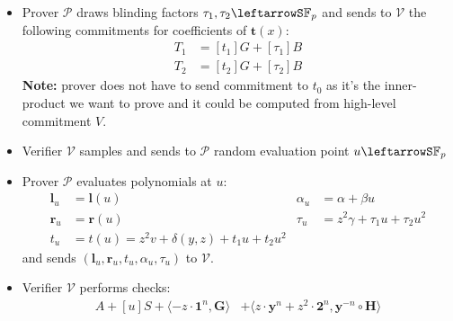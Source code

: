\documentclass[../lecture-notes-148x210.tex]{subfiles}
\begin{document}
\begin{definition}
\begin{itemize}
\begin{equation*}
\begin{aligned}
                    t_1 &= \langle \mathbf{a}_L - z \cdot \mathbf{1}^n, \mathbf{y}^n \circ \mathbf{s}_R \rangle + \langle \mathbf{y}^n \circ (\mathbf{a}_R + z\cdot \mathbf{1}^n ) + z^2 \cdot \mathbf{2}^n, \mathbf{s}_L\rangle \\
                    t_2 & = \langle \mathbf{s}_L, \mathbf{y}^n \circ \mathbf{s}_R \rangle
                \end{aligned}
            \end{equation*}
        \item Prover $\mathcal{P}$ draws blinding factors $\tau_1, \tau_2 \leftarrowS \mathbb{F}_p$ and sends to $\mathcal{V}$ the following commitments for coefficients of $\mathbf{t}(x)$:
            \begin{equation}
                \begin{aligned}
                    T_1 &= [t_1]G + [\tau_1]B \\
                    T_2 &= [t_2]G + [\tau_2]B
                \end{aligned}
            \end{equation}
            \textbf{Note:} prover does not have to send commitment to $t_0$ as it's the inner-product we want to prove and it could be computed from high-level commitment $V$.
        \item Verifier $\mathcal{V}$ samples and sends to $\mathcal{P}$ random evaluation point $u \leftarrowS \mathbb{F}_p$
        \item Prover $\mathcal{P}$ evaluates polynomials at $u$:
            \begin{equation}
                \begin{aligned}
                    \mathbf{l}_u & = \mathbf{l}(u) & \alpha_u &= \alpha + \beta u\\
                    \mathbf{r}_u &= \mathbf{r}(u) & \tau_u &= z^2\gamma + \tau_1 u + \tau_2 u^2\\
                    t_u &= t(u) = z^2v + \delta(y,z) + t_1u + t_2u^2 & 
                \end{aligned}
            \end{equation}
            and sends $(\mathbf{l}_u, \mathbf{r}_u, t_u, \alpha_u, \tau_u)$ to $\mathcal{V}$.
        \item Verifier $\mathcal{V}$ performs checks: 
            \begin{equation}
                \begin{aligned}
                    A + [u]S + \langle -z \cdot \mathbf{1}^n, \mathbf{G} \rangle &+ \langle z \cdot \mathbf{y}^n + z^2 \cdot \mathbf{2}^n, \mathbf{y}^{-n} \circ \mathbf{H} \rangle \\

\end{aligned}
\end{equation}
\end{itemize}
\end{definition}
\end{document}
